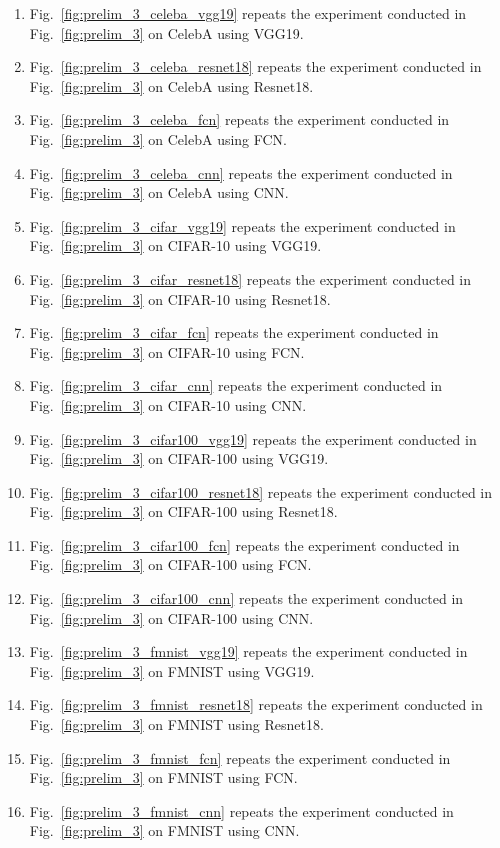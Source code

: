 \begin{enumerate}[leftmargin=5mm]
    \item Fig.~\ref{fig:prelim_3_celeba_vgg19} repeats the experiment conducted in Fig.~\ref{fig:prelim_3} on CelebA using VGG19.
    \item Fig.~\ref{fig:prelim_3_celeba_resnet18} repeats the experiment conducted in Fig.~\ref{fig:prelim_3} on CelebA using Resnet18.
    \item Fig.~\ref{fig:prelim_3_celeba_fcn} repeats the experiment conducted in Fig.~\ref{fig:prelim_3} on CelebA using FCN.
    \item Fig.~\ref{fig:prelim_3_celeba_cnn} repeats the experiment conducted in Fig.~\ref{fig:prelim_3} on CelebA using CNN.
    
    \item Fig.~\ref{fig:prelim_3_cifar_vgg19} repeats the experiment conducted in Fig.~\ref{fig:prelim_3} on CIFAR-10 using VGG19.
    \item Fig.~\ref{fig:prelim_3_cifar_resnet18} repeats the experiment conducted in Fig.~\ref{fig:prelim_3} on CIFAR-10 using Resnet18.
    \item Fig.~\ref{fig:prelim_3_cifar_fcn} repeats the experiment conducted in Fig.~\ref{fig:prelim_3} on CIFAR-10 using FCN.
    \item Fig.~\ref{fig:prelim_3_cifar_cnn} repeats the experiment conducted in Fig.~\ref{fig:prelim_3} on CIFAR-10 using CNN.
    
    \item Fig.~\ref{fig:prelim_3_cifar100_vgg19} repeats the experiment conducted in Fig.~\ref{fig:prelim_3} on CIFAR-100 using VGG19.
    \item Fig.~\ref{fig:prelim_3_cifar100_resnet18} repeats the experiment conducted in Fig.~\ref{fig:prelim_3} on CIFAR-100 using Resnet18.
    \item Fig.~\ref{fig:prelim_3_cifar100_fcn} repeats the experiment conducted in Fig.~\ref{fig:prelim_3} on CIFAR-100 using FCN.
    \item Fig.~\ref{fig:prelim_3_cifar100_cnn} repeats the experiment conducted in Fig.~\ref{fig:prelim_3} on CIFAR-100 using CNN.
    
    \item Fig.~\ref{fig:prelim_3_fmnist_vgg19} repeats the experiment conducted in Fig.~\ref{fig:prelim_3} on FMNIST using VGG19.
    \item Fig.~\ref{fig:prelim_3_fmnist_resnet18} repeats the experiment conducted in Fig.~\ref{fig:prelim_3} on FMNIST using Resnet18.
    \item Fig.~\ref{fig:prelim_3_fmnist_fcn} repeats the experiment conducted in Fig.~\ref{fig:prelim_3} on FMNIST using FCN.
    \item Fig.~\ref{fig:prelim_3_fmnist_cnn} repeats the experiment conducted in Fig.~\ref{fig:prelim_3} on FMNIST using CNN.
    

\end{enumerate}
